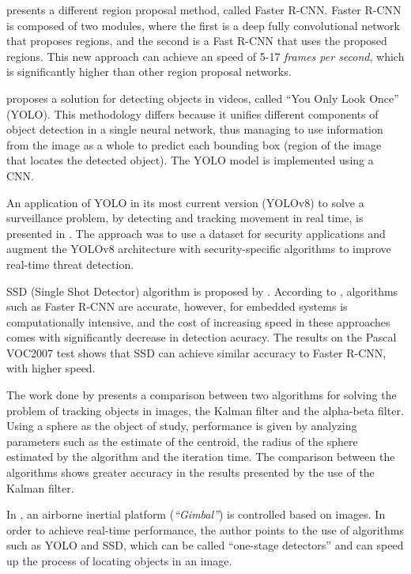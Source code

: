  presents a different region proposal method, called Faster R-CNN. Faster R-CNN is composed of two modules, where the first is a deep fully convolutional network that proposes regions, and the second is a Fast R-CNN that uses the proposed regions. This new approach can achieve an speed of 5-17 \textit{frames per second}, which is significantly higher than other region proposal networks.

 proposes a solution for detecting objects in videos, called ``You Only Look Once'' (YOLO). This methodology differs because it unifies different components of object detection in a single neural network, thus managing to use information from the image as a whole to predict each bounding box (region of the image that locates the detected object). The YOLO model is implemented using a CNN.

An application of YOLO in its most current version (YOLOv8) to solve a surveillance problem, by detecting and tracking movement in real time, is presented in . The approach was to use a dataset for security applications and augment the YOLOv8 architecture with security-specific algorithms to improve real-time threat detection.

SSD (Single Shot Detector) algorithm is proposed by . According to , algorithms such as Faster R-CNN are accurate, however, for embedded systems is computationally intensive, and the cost of increasing speed in these approaches comes with significantly decrease in detection acuracy. The results on the Pascal VOC2007 test shows that SSD can achieve similar accuracy to Faster R-CNN, with higher speed.

The work done by  presents a comparison between two algorithms for solving the problem of tracking objects in images, the Kalman filter and the alpha-beta filter. Using a sphere as the object of study, performance is given by analyzing parameters such as the estimate of the centroid, the radius of the sphere estimated by the algorithm and the iteration time. The comparison between the algorithms shows greater accuracy in the results presented by the use of the Kalman filter. 

In , an airborne inertial platform (\textit{``Gimbal''}) is controlled based on images. In order to achieve real-time performance, the author points to the use of algorithms such as YOLO and SSD, which can be called ``one-stage detectors'' and can speed up the process of locating objects in an image.
 
